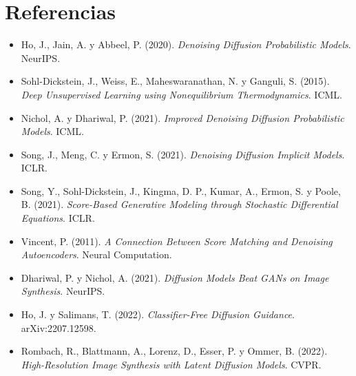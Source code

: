\documentclass[11pt,letterpaper,oneside]{report}
\begin{document}
\section*{Referencias}
\begin{itemize}[leftmargin=1em, label={}]
  \item Ho, J., Jain, A. y Abbeel, P. (2020). \emph{Denoising Diffusion Probabilistic Models}. NeurIPS.
  \item Sohl-Dickstein, J., Weiss, E., Maheswaranathan, N. y Ganguli, S. (2015). \emph{Deep Unsupervised Learning using Nonequilibrium Thermodynamics}. ICML.
  \item Nichol, A. y Dhariwal, P. (2021). \emph{Improved Denoising Diffusion Probabilistic Models}. ICML.
  \item Song, J., Meng, C. y Ermon, S. (2021). \emph{Denoising Diffusion Implicit Models}. ICLR.
  \item Song, Y., Sohl-Dickstein, J., Kingma, D. P., Kumar, A., Ermon, S. y Poole, B. (2021). \emph{Score-Based Generative Modeling through Stochastic Differential Equations}. ICLR.
  \item Vincent, P. (2011). \emph{A Connection Between Score Matching and Denoising Autoencoders}. Neural Computation.
  \item Dhariwal, P. y Nichol, A. (2021). \emph{Diffusion Models Beat GANs on Image Synthesis}. NeurIPS.
  \item Ho, J. y Salimans, T. (2022). \emph{Classifier-Free Diffusion Guidance}. arXiv:2207.12598.
  \item Rombach, R., Blattmann, A., Lorenz, D., Esser, P. y Ommer, B. (2022). \emph{High-Resolution Image Synthesis with Latent Diffusion Models}. CVPR.
\end{itemize}
\end{document}
